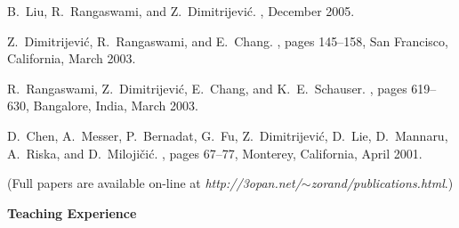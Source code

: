 \documentclass[10pt]{article}
\renewcommand{\section}[1]{ \vspace{10pt}\begin{flushleft}{\hspace{-0.2in }\Large\bf
    #1}\end{flushleft}\nopagebreak }
\begin{document}
\begin{thebibliography}{22.}
 B.~Liu, R.~Rangaswami, and Z.~Dimitrijevi\'c. 
 , December 2005.

 Z.~Dimitrijevi\'c, R.~Rangaswami, and E.~Chang.
 , 
 pages 145--158, San Francisco, California, March 2003.

 R.~Rangaswami, Z.~Dimitrijevi\'c, E.~Chang, and K.~E.~Schauser. 
 , pages 619--630, Bangalore, India, March 2003.


 D.~Chen, A.~Messer, P.~Bernadat, G.~Fu, Z.~Dimitrijevi\'c, 
 D.~Lie, D.~Mannaru, A.~Riska, and D.~Miloji\v{c}i\'c.
 , pages 67--77, Monterey, California, April 2001.
\end{thebibliography}




\vspace{-5pt}
\hspace{0.25in} (Full papers are available on-line at 
{\em http://3opan.net/$\sim$zorand/publications.html}.)


\section{Teaching Experience}
\end{document}
